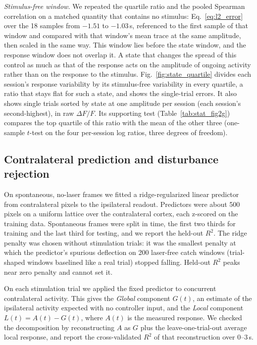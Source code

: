 \emph{Stimulus-free window.} We repeated the quartile ratio and the pooled
Spearman correlation on a matched quantity that contains no stimulus:
Eq.~\eqref{eq:l2_error} over the 18 samples from $-1.51$ to $-1.03$\,s,
referenced to the first sample of that window and compared with that window's
mean trace at the same amplitude, then scaled in the same way. This window lies
before the state window, and the response window does not overlap it. A state
that changes the spread of this control as much as that of the response acts on
the amplitude of ongoing activity rather than on the response to the stimulus.
Fig.~\ref{fig:state_quartile} divides each session's response variability by its
stimulus-free variability in every quartile, a ratio that stays flat for such a
state, and shows the single-trial errors. It also shows single trials sorted by
state at one amplitude per session (each session's second-highest), in raw
$\Delta F/F$. Its supporting test (Table~\ref{tab:stat_fig2g}) compares the top quartile of this
ratio with the mean of the other three (one-sample $t$-test on the four
per-session log ratios, three degrees of freedom).

\subsection*{Contralateral prediction and disturbance rejection}
\label{sec:disturbance_decomp}

On spontaneous, no-laser frames we fitted a ridge-regularized linear predictor
from contralateral pixels to the ipsilateral readout. Predictors were about 500
pixels on a uniform lattice over the contralateral cortex, each z-scored on the
training data. Spontaneous frames were split in time, the first two thirds for
training and the last third for testing, and we report the held-out $R^{2}$.
The ridge penalty was chosen without stimulation trials: it was the smallest
penalty at which the predictor's spurious deflection on 200 laser-free catch
windows (trial-shaped windows baselined like a real trial) stopped falling.
Held-out $R^2$ peaks near zero penalty and cannot set it.

On each stimulation trial we applied the fixed predictor to concurrent
contralateral activity. This gives the \emph{Global} component $G(t)$, an
estimate of the ipsilateral activity expected with no controller input, and the
\emph{Local} component $L(t) = A(t) - G(t)$, where $A(t)$ is the measured
response. We checked the decomposition by reconstructing $A$ as $G$ plus the
leave-one-trial-out average local response, and report the cross-validated
$R^{2}$ of that reconstruction over 0--3\,s.

